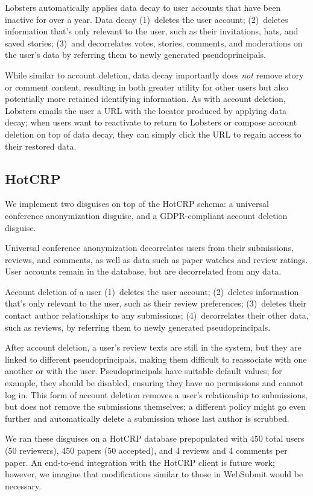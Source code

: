 Lobsters automatically applies data decay to user accounts that have been inactive for over a year.
Data decay 
%
(1)~deletes the user account;
%
(2)~deletes information that's only relevant to the user, such as their invitations, hats, and saved
stories;
%
(3)~and decorrelates votes, stories, comments, and moderations on the user's data by referring them
to newly generated pseudoprincipals.
%

While similar to account deletion, data decay importantly does \emph{not} remove story or comment
content, resulting in both greater utility for other users but also potentially more retained
identifying information.  As with account deletion, Lobsters emails the user a URL with the locator
produced by applying data decay; when users want to reactivate to return to Lobsters or compose
account deletion on top of data decay, they can simply click the URL to regain access to their
restored data.

\subsection{HotCRP}
We implement two disguises on top of the HotCRP schema: a universal conference anonymization disguise, and a
GDPR-compliant account deletion disguise.

Universal conference anonymization decorrelates users from their submissions, reviews, and comments,
as well as data such as paper watches and review ratings. User accounts remain in the database, but
are decorrelated from any data.

 Account deletion of a user 
%
(1)~deletes the user account;
%
(2)~deletes information that's only relevant to the user, such as their review preferences;
%
(3)~deletes their contact author relationships to any submissions;
%
(4)~decorrelates their other data, such as reviews, by referring them to newly generated pseudoprincipals.

After account deletion, a user's review texts are still in the system, but they are linked to
different pseudoprincipals, making them difficult to reassociate with one another or with the user.
%
Pseudoprincipals have suitable default values; for example, they should be disabled, ensuring they
have no permissions and cannot log in.
%
This form of account deletion removes a user's relationship to submissions, but does not remove the
submissions themselves; a different policy might go even further and automatically delete a
submission whose last author is scrubbed.

We ran these disguises on a HotCRP database prepopulated with 450 total users (50 reviewers), 450 papers
(50 accepted), and 4 reviews and 4 comments per paper. 
An end-to-end integration with the HotCRP client is future work; however, we imagine that
modifications similar to those in WebSubmit would be necessary.
